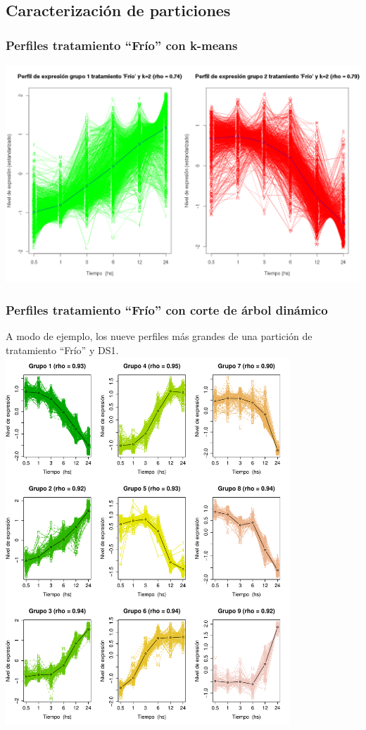 \documentclass[serif,9pt, t]{beamer}
\begin{document}
\subsection{Caracterización de particiones}
\begin{frame}\frametitle{Perfiles tratamiento ``Frío'' con k-means} 
\centering
\includegraphics[width=1\textwidth]{perfiles_k_means}	
\end{frame}

\begin{frame}\frametitle{Perfiles tratamiento ``Frío'' con corte de árbol dinámico} 
\centering
A modo de ejemplo, los nueve perfiles más grandes de una partición de tratamiento ``Frío'' y DS1.\\
\includegraphics[width=0.8\textwidth, height=0.8\textheight]{perfiles_ds_1.pdf}	
\end{frame}
\end{document}
